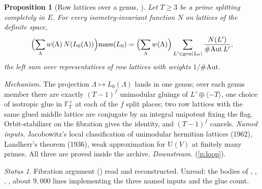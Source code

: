 \documentclass[11pt]{article}
\newtheorem{prop}{Proposition}
\theoremstyle{remark}
\newtheorem*{status}{Status}
\begin{document}
\begin{prop}[Row lattices over a genus, ]\label{p:fib}
Let $T\ge3$ be a prime splitting completely in $E$. For every isometry-invariant function $N$ on lattices of the definite space,
\[
\Bigl(\sum_{\Lambda}w(\Lambda)\,N(L_0(\Lambda))\Bigr)\mathrm{mass}(L_0)=\Bigl(\sum_\Lambda w(\Lambda)\Bigr)\sum_{L'\in\mathrm{gen}(L_0)}\frac{N(L')}{\#\mathrm{Aut}\,L'},
\]
the left sum over representatives of row lattices with weights $1/\#\mathrm{Aut}$.
\end{prop}
\emph{Mechanism.} The projection $\Lambda\mapsto L_0(\Lambda)$ lands in one genus; over each genus member there are exactly $(T-1)^f$ unimodular gluings of $L'\oplus\langle-T\rangle$, one choice of isotropic glue in $\mathbb F_T^\times$ at each of the $f$ split places; two row lattices with the same glued middle lattice are conjugate by an integral unipotent fixing the flag. Orbit-stabilizer on the fibration gives the identity, and $(T-1)^f$ cancels.
\emph{Named inputs.} Jacobowitz's local classification of unimodular hermitian lattices (1962), Landherr's theorem (1936), weak approximation for $\mathrm U(V)$ at finitely many primes. All three are proved inside the archive.
\emph{Downstream.}  (\ref{p:loop}).
\begin{status}Fibration argument () read and reconstructed. Unread: the bodies of , , , , about $9{,}000$ lines implementing the three named inputs and the glue count.\end{status}
\end{document}
